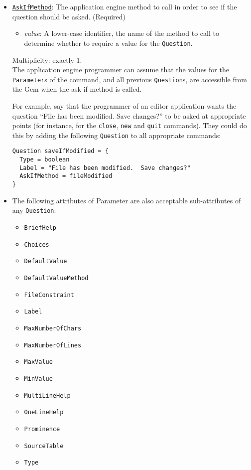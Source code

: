 \documentclass[11pt]{article}
\begin{document}
\begin{itemize}

\item \underline{\tt AskIfMethod}:  The application engine
method to call in order to see if the question should be asked.
(Required)
\begin{itemize}
\item {\it value}: A lower-case identifier, the name of the
  method to call to determine whether to require a value for
  the {\tt Question}.
\end{itemize}
Multiplicity: exactly 1. \\
The application engine programmer can assume that the values for
the {\tt Parameter}s of the command, and all previous {\tt Question}s,
are accessible from the Gem when the ask-if method is called.

For example, say that the programmer of an editor
application wants the question ``File has been modified.  Save changes?''
to be asked at appropriate points (for instance, for the {\tt close},
{\tt new}  and {\tt quit} commands).  They could do this by adding
the following {\tt Question} to all appropriate commands:
\begin{verbatim}
Question saveIfModified = {
  Type = boolean
  Label = "File has been modified.  Save changes?"
  AskIfMethod = fileModified
}
\end{verbatim}

\item The following attributes of Parameter are also acceptable
  sub-attributes of any {\tt Question}:
  \begin{itemize}
  \item{} {\tt BriefHelp}
  \item{} {\tt Choices}
  \item{} {\tt DefaultValue}
  \item{} {\tt DefaultValueMethod}
  \item{} {\tt FileConstraint}
  \item{} {\tt Label}
  \item{} {\tt MaxNumberOfChars}
  \item{} {\tt MaxNumberOfLines}
  \item{} {\tt MaxValue}
  \item{} {\tt MinValue}
  \item{} {\tt MultiLineHelp}
  \item{} {\tt OneLineHelp}
  \item{} {\tt Prominence}
  \item{} {\tt SourceTable}
  \item{} {\tt Type}
  \end{itemize}


\end{itemize}
\end{document}
